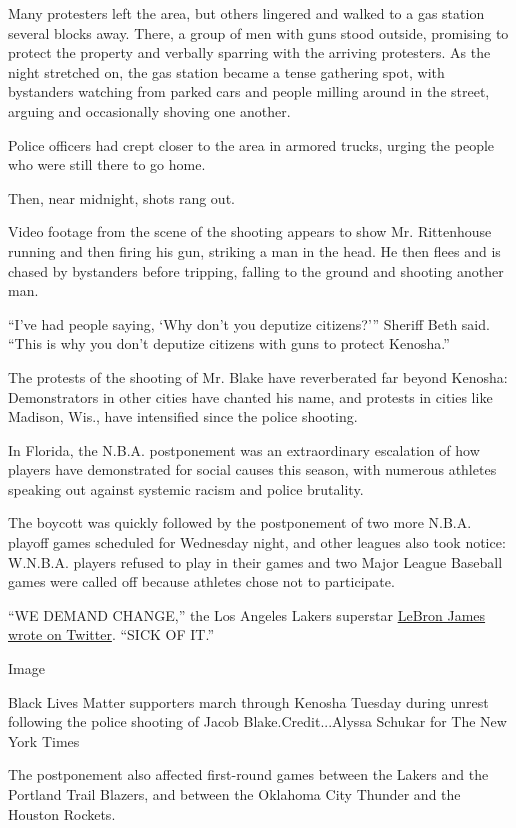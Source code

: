 Many protesters left the area, but others lingered and walked to a gas
station several blocks away. There, a group of men with guns stood
outside, promising to protect the property and verbally sparring with
the arriving protesters. As the night stretched on, the gas station
became a tense gathering spot, with bystanders watching from parked cars
and people milling around in the street, arguing and occasionally
shoving one another.

Police officers had crept closer to the area in armored trucks, urging
the people who were still there to go home.

Then, near midnight, shots rang out.

Video footage from the scene of the shooting appears to show Mr.
Rittenhouse running and then firing his gun, striking a man in the head.
He then flees and is chased by bystanders before tripping, falling to
the ground and shooting another man.

``I've had people saying, `Why don't you deputize citizens?''' Sheriff
Beth said. ``This is why you don't deputize citizens with guns to
protect Kenosha.''

The protests of the shooting of Mr. Blake have reverberated far beyond
Kenosha: Demonstrators in other cities have chanted his name, and
protests in cities like Madison, Wis., have intensified since the police
shooting.

In Florida, the N.B.A. postponement was an extraordinary escalation of
how players have demonstrated for social causes this season, with
numerous athletes speaking out against systemic racism and police
brutality.

The boycott was quickly followed by the postponement of two more N.B.A.
playoff games scheduled for Wednesday night, and other leagues also took
notice: W.N.B.A. players refused to play in their games and two Major
League Baseball games were called off because athletes chose not to
participate.

``WE DEMAND CHANGE,'' the Los Angeles Lakers superstar
\href{https://twitter.com/KingJames/status/1298721240748711936}{LeBron
James wrote on Twitter}. ``SICK OF IT.''

Image

Black Lives Matter supporters march through Kenosha Tuesday during
unrest following the police shooting of Jacob Blake.Credit...Alyssa
Schukar for The New York Times

The postponement also affected first-round games between the Lakers and
the Portland Trail Blazers, and between the Oklahoma City Thunder and
the Houston Rockets.

